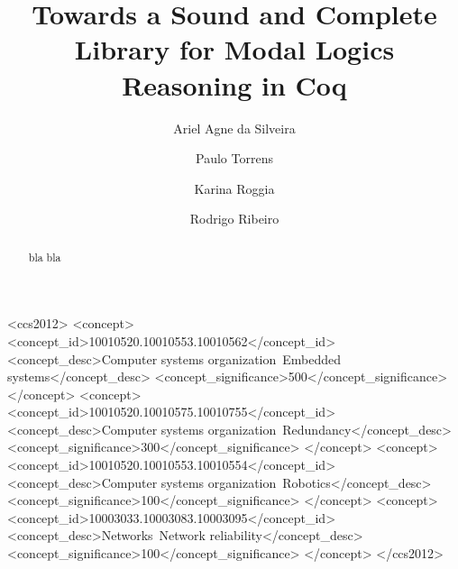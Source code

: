 \documentclass[sigconf]{acmart}
\begin{document}
\title{Towards a Sound and Complete Library for Modal Logics Reasoning in Coq}

\author{Ariel Agne da Silveira}
\author{Paulo Torrens}
\author{Karina Roggia}
\author{Rodrigo Ribeiro}

\renewcommand{\shortauthors}{da Silveira et al.}

\begin{abstract}
 bla bla
\end{abstract}

\begin{CCSXML}
<ccs2012>
 <concept>
  <concept_id>10010520.10010553.10010562</concept_id>
  <concept_desc>Computer systems organization~Embedded systems</concept_desc>
  <concept_significance>500</concept_significance>
 </concept>
 <concept>
  <concept_id>10010520.10010575.10010755</concept_id>
  <concept_desc>Computer systems organization~Redundancy</concept_desc>
  <concept_significance>300</concept_significance>
 </concept>
 <concept>
  <concept_id>10010520.10010553.10010554</concept_id>
  <concept_desc>Computer systems organization~Robotics</concept_desc>
  <concept_significance>100</concept_significance>
 </concept>
 <concept>
  <concept_id>10003033.10003083.10003095</concept_id>
  <concept_desc>Networks~Network reliability</concept_desc>
  <concept_significance>100</concept_significance>
 </concept>
</ccs2012>
\end{CCSXML}

\end{document}
